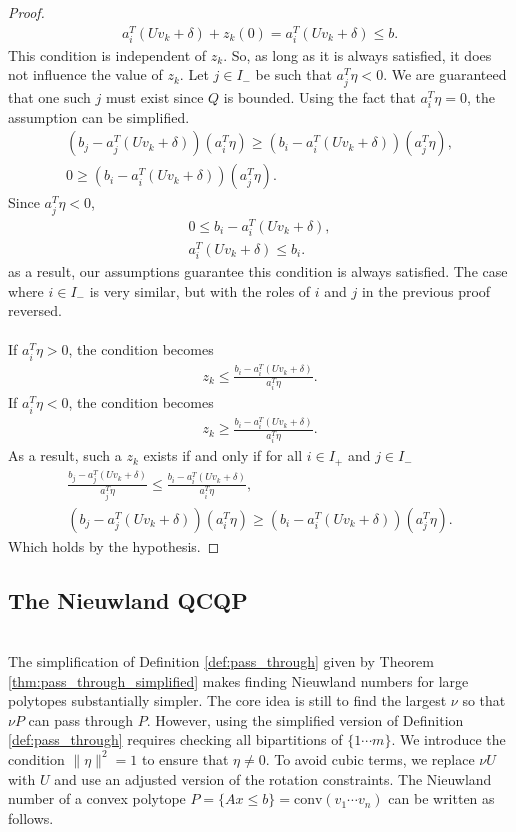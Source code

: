 \documentclass[a4paper]{amsart}
\theoremstyle{remark}
\begin{document}
\begin{proof}
	\begin{gather*}
		a_i^T(Uv_k+\delta)+z_k(0) = a_i^T(Uv_k+\delta) \leq b.
	\end{gather*}
    This condition is independent of $z_k$. So, as long as it is always satisfied, it does not influence the value of $z_k$. Let $j \in I_-$ be such that $a_j^T \eta < 0$. We are guaranteed that one such $j$ must exist since $Q$ is bounded. Using the fact that $a_i^T\eta = 0$, the assumption can be simplified.
    \begin{gather*}
		(b_j-a_j^T(Uv_k+\delta))(a_i^T\eta) \geq (b_i-a_i^T(Uv_k+\delta))(a_j^T\eta),\\
        0 \geq (b_i-a_i^T(Uv_k+\delta))(a_j^T\eta).
	\end{gather*}
    Since $a_j^T\eta < 0$,
    \begin{gather*}
        0 \leq b_i-a_i^T(Uv_k+\delta),\\
        a_i^T(Uv_k+\delta) \leq b_i.
	\end{gather*}
	as a result, our assumptions guarantee this condition is always satisfied. The case where $i \in I_-$ is very similar, but with the roles of $i$ and $j$ in the previous proof reversed.\\\\
	If $a_i^T\eta > 0$, the condition becomes
	\begin{gather*}
		z_k \leq \frac{b_i-a_i^T(Uv_k+\delta)}{a_i^T\eta}.
	\end{gather*}
	If $a_i^T\eta < 0$, the condition becomes
	\begin{gather*}
		z_k \geq \frac{b_i-a_i^T(Uv_k+\delta)}{a_i^T\eta}.
	\end{gather*}
	As a result, such a $z_k$ exists if and only if for all $i \in I_+$ and $j \in I_-$
	\begin{gather*}
		\frac{b_j-a_j^T(Uv_k+\delta)}{a_j^T\eta} \leq \frac{b_i-a_i^T(Uv_k+\delta)}{a_i^T\eta},\\
		(b_j-a_j^T(Uv_k+\delta))(a_i^T\eta) \geq (b_i-a_i^T(Uv_k+\delta))(a_j^T\eta).
	\end{gather*}
    Which holds by the hypothesis.
\end{proof}
\subsection{The Nieuwland QCQP}\label{subsec:nieuwland_qcqp}
\hfill \\
The simplification of Definition \ref{def:pass_through} given by Theorem \ref{thm:pass_through_simplified} makes finding Nieuwland numbers for large polytopes substantially simpler. The core idea is still to find the largest $\nu$ so that $\nu P$ can pass through $P$. However, using the simplified version of Definition \ref{def:pass_through} requires checking all bipartitions of $\{1 \cdots m\}$. We introduce the condition $\lVert \eta \rVert^2 = 1$ to ensure that $\eta \neq 0$. To avoid cubic terms, we replace $\nu U$ with $U$ and use an adjusted version of the rotation constraints. The Nieuwland number of a convex polytope $P=\{Ax \leq b\} = \textrm{conv}(v_1 \cdots v_n)$ can be written as follows. 
\end{document}
